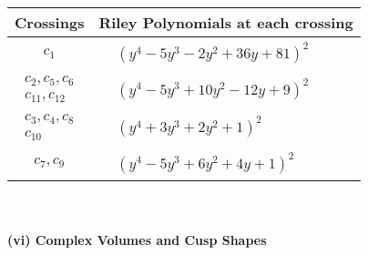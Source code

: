 \documentclass[1p]{elsarticle_modified}
\theoremstyle{definition}
\begin{document}
\begin{tabular}{m{50pt}|m{274pt}}
Crossings & \hspace{64pt}Riley Polynomials at each crossing \\
\hline $$\begin{aligned}c_{1}\end{aligned}$$&$\begin{aligned}
&(y^4-5 y^3-2 y^2+36 y+81)^2
\end{aligned}$\\
\hline $$\begin{aligned}c_{2},c_{5},c_{6}\\c_{11},c_{12}\end{aligned}$$&$\begin{aligned}
&(y^4-5 y^3+10 y^2-12 y+9)^2
\end{aligned}$\\
\hline $$\begin{aligned}c_{3},c_{4},c_{8}\\c_{10}\end{aligned}$$&$\begin{aligned}
&(y^4+3 y^3+2 y^2+1)^2
\end{aligned}$\\
\hline $$\begin{aligned}c_{7},c_{9}\end{aligned}$$&$\begin{aligned}
&(y^4-5 y^3+6 y^2+4 y+1)^2
\end{aligned}$\\
\hline
\end{tabular}\\~\\
\newpage\flushleft \textbf{(vi) Complex Volumes and Cusp Shapes}
\end{document}
